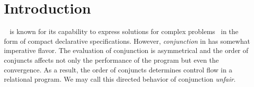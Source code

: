 \section{Introduction}


\mk~\cite{fair:TheReasonedSchemer,fair:micro} is known for its capability to express solutions for complex problems~\cite{fair:quines,fair:theorem-prover,fair:seven}
in the form of compact declarative specifications. However, \emph{conjunction} in \mk has somewhat imperative flavor. The evaluation of conjunction is asymmetrical
and the order of conjuncts affects not only the performance of the program but even the convergence. As a result, the order of conjuncts determines control flow in
a relational program. We may call this directed behavior of conjunction \textit{unfair}.

